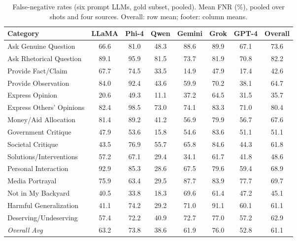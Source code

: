 \begin{table}[htbp]
\centering
\begin{tabular}{lccccccc}
\toprule
Category & LLaMA & Phi-4 & Qwen & Gemini & Grok & GPT-4 & Overall \\
\midrule
Ask Genuine Question & 66.6 & 81.0 & 48.3 & 88.6 & 89.9 & 67.1 & 73.6 \\
Ask Rhetorical Question & 89.1 & 95.9 & 81.5 & 73.7 & 81.9 & 70.8 & 82.2 \\
Provide Fact/Claim & 67.7 & 74.5 & 33.5 & 14.9 & 47.9 & 17.4 & 42.6 \\
Provide Observation & 84.0 & 92.4 & 43.6 & 59.9 & 70.2 & 38.1 & 64.7 \\
Express Opinion & 20.6 & 49.3 & 11.1 & 37.2 & 64.5 & 31.5 & 35.7 \\
Express Others' Opinions & 82.4 & 98.5 & 73.0 & 74.1 & 83.3 & 71.0 & 80.4 \\
Money/Aid Allocation & 81.4 & 89.2 & 41.2 & 56.9 & 79.9 & 56.7 & 67.6 \\
Government Critique & 47.9 & 53.6 & 15.8 & 54.6 & 83.6 & 51.1 & 51.1 \\
Societal Critique & 43.5 & 76.9 & 55.7 & 65.8 & 84.6 & 44.3 & 61.8 \\
Solutions/Interventions & 57.2 & 67.1 & 29.4 & 34.1 & 61.7 & 41.8 & 48.6 \\
Personal Interaction & 92.9 & 85.3 & 28.6 & 67.5 & 79.6 & 59.4 & 68.9 \\
Media Portrayal & 75.9 & 63.4 & 29.5 & 87.7 & 83.9 & 77.7 & 69.7 \\
Not in My Backyard & 40.5 & 33.8 & 18.3 & 69.6 & 61.4 & 47.2 & 45.1 \\
Harmful Generalization & 41.1 & 74.2 & 29.2 & 71.0 & 91.1 & 60.1 & 61.1 \\
Deserving/Undeserving & 57.4 & 72.2 & 40.9 & 72.7 & 77.0 & 57.2 & 62.9 \\
\midrule
\textit{Overall Avg} & 63.2 & 73.8 & 38.6 & 61.9 & 76.0 & 52.8 & 61.1 \\
\bottomrule
\end{tabular}
\caption{False-negative rates (six prompt LLMs, gold subset, pooled). Mean FNR (\%), pooled over shots and four sources. Overall: row mean; footer: column means.}
\label{tab:underdetection_fnr_pooled}
\end{table}
